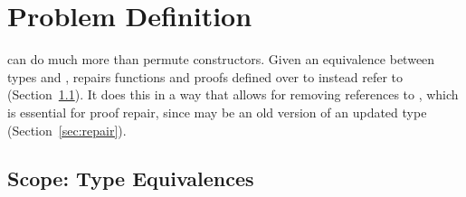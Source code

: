 \section{Problem Definition}
\label{sec:key1}

\toolname can do much more than permute constructors. %
Given an equivalence between types \A and \B,
\toolname repairs functions and proofs defined over \A to instead refer to \B (Section~\ref{sec:scope}).
It does this in a way that allows for removing references to \A, which is essential for proof repair,
since \A may be an old version of an updated type (Section~\ref{sec:repair}).



\subsection{Scope: Type Equivalences}
\label{sec:scope}

